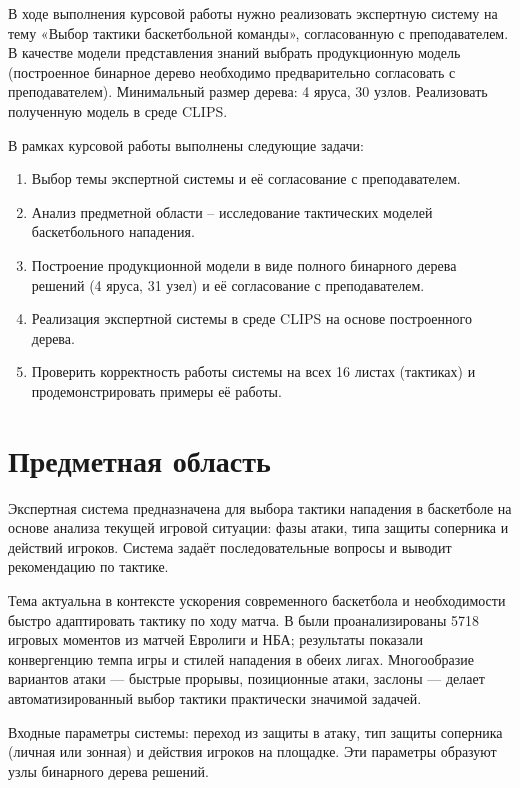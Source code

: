 \documentclass[a4paper, final]{article}
\begin{document}
\justifying

В ходе выполнения курсовой работы нужно реализовать экспертную систему на тему «Выбор тактики баскетбольной команды», согласованную с преподавателем. В качестве модели представления знаний выбрать продукционную модель (построенное бинарное дерево необходимо предварительно согласовать
с преподавателем). Минимальный размер дерева: 4 яруса, 30 узлов. Реализовать полученную модель в среде CLIPS.

В рамках курсовой работы выполнены следующие задачи:
\begin{enumerate}
    \item Выбор темы экспертной системы и её согласование с преподавателем.
    \item Анализ предметной области -- исследование тактических моделей баскетбольного нападения.
    \item Построение продукционной модели в виде полного бинарного дерева решений (4 яруса, 31 узел) и её согласование с преподавателем.
    \item Реализация экспертной системы в среде CLIPS на основе построенного дерева.
    \item Проверить корректность работы системы на всех 16 листах (тактиках) и продемонстрировать примеры её работы.
\end{enumerate}

\newpage

\section{Предметная область}

\justifying

Экспертная система предназначена для выбора тактики нападения в баскетболе на основе анализа текущей игровой ситуации: фазы атаки, типа защиты соперника и действий игроков. Система задаёт последовательные вопросы и выводит рекомендацию по тактике.

Тема актуальна в контексте ускорения современного баскетбола и необходимости быстро адаптировать тактику по ходу матча. В \cite{selmanović} были проанализированы 5718 игровых моментов из матчей Евролиги и НБА; результаты показали конвергенцию темпа игры и стилей нападения в обеих лигах. Многообразие вариантов атаки — быстрые прорывы, позиционные атаки, заслоны — делает автоматизированный выбор тактики практически значимой задачей.

Входные параметры системы: переход из защиты в атаку, тип защиты соперника (личная или зонная) и действия игроков на площадке. Эти параметры образуют узлы бинарного дерева решений.
\end{document}
